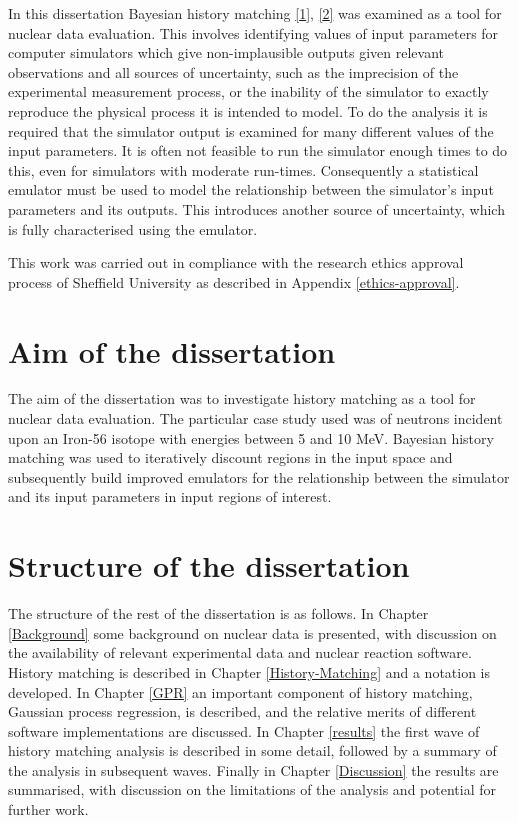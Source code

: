 \documentclass[
  12pt,
  a4paper,
  twoside]{book}
\begin{document}
In this dissertation Bayesian history matching \protect\hyperlink{ref-jeremy_histmatch}{{[}1{]}}, \protect\hyperlink{ref-bower2010galaxy}{{[}2{]}} was examined as a tool for nuclear data evaluation. This involves identifying values of input parameters for computer simulators which give non-implausible outputs given relevant observations and all sources of uncertainty, such as the imprecision of the experimental measurement process, or the inability of the simulator to exactly reproduce the physical process it is intended to model. To do the analysis it is required that the simulator output is examined for many different values of the input parameters. It is often not feasible to run the simulator enough times to do this, even for simulators with moderate run-times. Consequently a statistical emulator must be used to model the relationship between the simulator's input parameters and its outputs. This introduces another source of uncertainty, which is fully characterised using the emulator.

This work was carried out in compliance with the research ethics approval process of Sheffield University as described in Appendix \ref{ethics-approval}.

\hypertarget{Background:aim}{%
\section{Aim of the dissertation}\label{Background:aim}}

The aim of the dissertation was to investigate history matching as a tool for nuclear data evaluation. The particular case study used was of neutrons incident upon an Iron-56 isotope with energies between 5 and 10 MeV. Bayesian history matching was used to iteratively discount regions in the input space and subsequently build improved emulators for the relationship between the simulator and its input parameters in input regions of interest.

\hypertarget{structure-of-the-dissertation}{%
\section{Structure of the dissertation}\label{structure-of-the-dissertation}}

The structure of the rest of the dissertation is as follows. In Chapter \ref{Background} some background on nuclear data is presented, with discussion on the availability of relevant experimental data and nuclear reaction software. History matching is described in Chapter \ref{History-Matching} and a notation is developed. In Chapter \ref{GPR} an important component of history matching, Gaussian process regression, is described, and the relative merits of different software implementations are discussed. In Chapter \ref{results} the first wave of history matching analysis is described in some detail, followed by a summary of the analysis in subsequent waves. Finally in Chapter \ref{Discussion} the results are summarised, with discussion on the limitations of the analysis and potential for further work.
\end{document}
